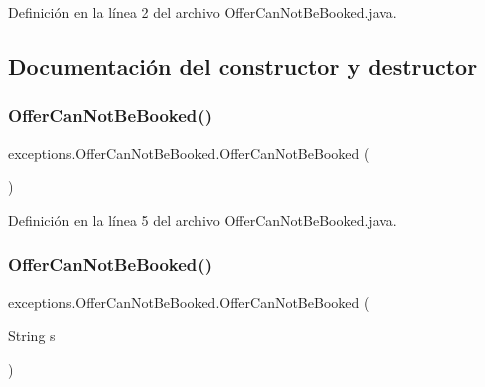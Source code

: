 Definición en la línea 2 del archivo Offer\+Can\+Not\+Be\+Booked.\+java.



\subsection{Documentación del constructor y destructor}
\mbox{\label{classexceptions_1_1_offer_can_not_be_booked_a113511bf6eedf993448d483ff55cabb0}} 
\subsubsection{\texorpdfstring{OfferCanNotBeBooked()}{OfferCanNotBeBooked()}\hspace{0.1cm}{\footnotesize\ttfamily [1/2]}}
{\footnotesize\ttfamily exceptions.\+Offer\+Can\+Not\+Be\+Booked.\+Offer\+Can\+Not\+Be\+Booked (\begin{DoxyParamCaption}{ }\end{DoxyParamCaption})}



Definición en la línea 5 del archivo Offer\+Can\+Not\+Be\+Booked.\+java.


\begin{DoxyCode}{0}

\end{DoxyCode}
\mbox{\label{classexceptions_1_1_offer_can_not_be_booked_a08f25182868a230f2b49b37483560486}} 
\subsubsection{\texorpdfstring{OfferCanNotBeBooked()}{OfferCanNotBeBooked()}\hspace{0.1cm}{\footnotesize\ttfamily [2/2]}}
{\footnotesize\ttfamily exceptions.\+Offer\+Can\+Not\+Be\+Booked.\+Offer\+Can\+Not\+Be\+Booked (\begin{DoxyParamCaption}\item[{String}]{s }\end{DoxyParamCaption})}



